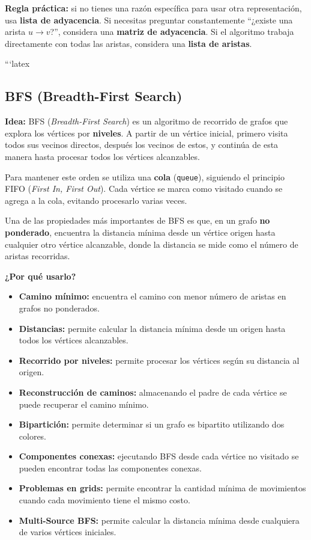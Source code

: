 \documentclass[10pt,a4paper,twocolumn]{article}
\begin{document}
\textbf{Regla práctica:} si no tienes una razón específica para usar
otra representación, usa \textbf{lista de adyacencia}. Si necesitas
preguntar constantemente ``¿existe una arista $u\rightarrow v$?'',
considera una \textbf{matriz de adyacencia}. Si el algoritmo trabaja
directamente con todas las aristas, considera una \textbf{lista de
aristas}.

```latex
\subsection{BFS (Breadth-First Search)}

\textbf{Idea:} BFS (\textit{Breadth-First Search}) es un algoritmo de
recorrido de grafos que explora los vértices por \textbf{niveles}. A
partir de un vértice inicial, primero visita todos sus vecinos
directos, después los vecinos de estos, y continúa de esta manera
hasta procesar todos los vértices alcanzables.

Para mantener este orden se utiliza una \textbf{cola}
(\texttt{queue}), siguiendo el principio FIFO (\textit{First In,
First Out}). Cada vértice se marca como visitado cuando se agrega a
la cola, evitando procesarlo varias veces.

Una de las propiedades más importantes de BFS es que, en un grafo
\textbf{no ponderado}, encuentra la distancia mínima desde un vértice
origen hasta cualquier otro vértice alcanzable, donde la distancia se
mide como el número de aristas recorridas.

\textbf{¿Por qué usarlo?}

\begin{itemize}
    \item \textbf{Camino mínimo:} encuentra el camino con menor número
    de aristas en grafos no ponderados.

    \item \textbf{Distancias:} permite calcular la distancia mínima
    desde un origen hasta todos los vértices alcanzables.

    \item \textbf{Recorrido por niveles:} permite procesar los
    vértices según su distancia al origen.

    \item \textbf{Reconstrucción de caminos:} almacenando el padre de
    cada vértice se puede recuperar el camino mínimo.

    \item \textbf{Bipartición:} permite determinar si un grafo es
    bipartito utilizando dos colores.

    \item \textbf{Componentes conexas:} ejecutando BFS desde cada
    vértice no visitado se pueden encontrar todas las componentes
    conexas.

    \item \textbf{Problemas en grids:} permite encontrar la cantidad
    mínima de movimientos cuando cada movimiento tiene el mismo costo.

    \item \textbf{Multi-Source BFS:} permite calcular la distancia
    mínima desde cualquiera de varios vértices iniciales.
\end{itemize}
\end{document}
